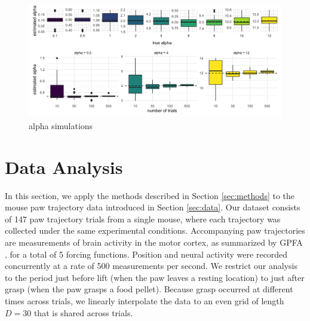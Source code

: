 \documentclass[preprint]{JASA}
\begin{document}
\begin{figure}
\includegraphics[width=\reprintcolumnwidth]{../output/fig_sim_alpha-1} \caption{alpha simulations}\label{fig:sim_alpha}
\end{figure}

\hypertarget{data-analysis}{%
\section{Data Analysis}\label{data-analysis}}

\label{sec:results}

In this section, we apply the methods described in Section
\ref{sec:methods} to the mouse paw trajectory data introduced in Section
\ref{sec:data}. Our dataset consists of 147 paw trajectory trials from a
single mouse, where each trajectory was collected under the same
experimental conditions. Accompanying paw trajectories are measurements
of brain activity in the motor cortex, as summarized by GPFA
\citep{yu2009}, for a total of 5 forcing functions. Position and neural
activity were recorded concurrently at a rate of 500 measurements per
second. We restrict our analysis to the period just before lift (when
the paw leaves a resting location) to just after grasp (when the paw
grasps a food pellet). Because grasp occurred at different times across
trials, we linearly interpolate the data to an even grid of length
\(D = 30\) that is shared across trials.
\end{document}

